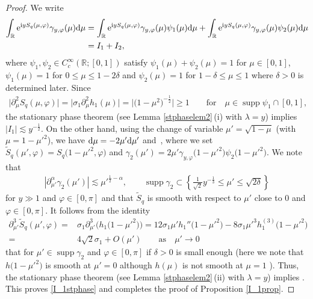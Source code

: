 \documentclass[pdftex]{sigma}
\numberwithin{equation}{section}
\def\R{\mathbb{R}}%
\def\d{\,\mathrm{d}}%
\DeclareMathOperator{\supp}{supp}%
\def\a{\alpha}
\def\c{\gamma}
\def\d{\delta}
\def\f{\varphi}
\def\g{\psi}
\def\l{\lambda}
\def\m{\mu}
\def\s{\sigma}
\def\pa{\partial}
\begin{document}
\begin{proof}
We write
\begin{align*}
\int_{\R}{\rm e}^{{\rm i}yS_q(\m,\f) }\c_{y,\f}(\m){\rm d}\m&=\int_{\R}{\rm e}^{{\rm i}yS_q(\m,\f) }\c_{y,\f}(\m)\g_1(\m){\rm d}\m+\int_{\R}{\rm e}^{{\rm i}yS_q(\m,\f) }\c_{y,\f}(\m)\g_2(\m){\rm d}\m\\
&=I_1+I_2,
\end{align*}
where $\g_1,\g_2\in C_c^{\infty}(\R;[0,1])$ satisfy $\g_1(\m)+\g_2(\m)=1$ for $\m\in [0,1]$, $\g_1(\m)=1$ for $0\leq \m\leq 1-2\d$ and $\g_2(\m)=1$ for $1-\d\leq \m\leq 1$ where $\d>0$ is determined later.
Since
\begin{align*}
\big|\pa_{\m}^2S_{q}(\m,\f)\big|=\big|\s_1\pa_{\m}^2h_1(\m)\big|=\big|\bigl(1-\m^2\bigr)^{-\frac{1}{2}}\big|\ge 1\qquad \text{for}\quad \m\in \supp \g_1\cap[0,1],
\end{align*}
the stationary phase theorem (see Lemma \ref{stphaselem2}\,(i) with $\l=y$) implies $|I_1|\lesssim y^{-\frac{1}{2}}$.
On the other hand, using the change of variable $\m'=\sqrt{1-\m}$ (with $\m=1-\m'^2$), we have ${\rm d}\m=-2\m'{\rm d}\m'$ and~\smash{$
I_2=\int_{\R}{\rm e}^{{\rm i}y\tilde{S}_q(\m',\f) }\c_2(\m'){\rm d}\m'$},
where we set $\tilde{S}_q(\m',\f)=S_q\bigl(1-\m'^2,\f\bigr)$ and $\c_2(\m')=2\m'\c_{y,\f}\bigl(1-\m'^2\bigr)\g_2\bigl(1-\m'^2\bigr)$. We note that
\begin{align*}
|\pa_{\m'}^{\a}\c_2(\m')|\lesssim\m'^{\frac{1}{2}-\a},\qquad\supp\c_2\subset \left\{ \frac{1}{\sqrt{2}}y^{-\frac{1}{3}}\leq \m'\leq \sqrt{2\d}\right\}
\end{align*}
for $y\gg 1$ and $\f\in [0,\pi]$ and that $\tilde{S}_q$ is smooth with respect to $\m'$ close to $0$ and $\f\in[0,\pi]$.
It follows from the identity
\begin{align*}
\pa_{\m'}^3\tilde{S}_q(\m',\f)={}&\s_1\pa_{\m'}^3\bigl(h_1\bigl(1-\m'^2\bigr)\bigr)=12\s_1\m' h_1''\bigl(1-\m'^2\bigr)-8\s_1\m'^3h_1^{(3)}\bigl(1-\m'^2\bigr)\\
={}&4\sqrt{2}\s_1+O(\m')\qquad \text{as}\quad \m'\to 0
\end{align*}
that \smash{$\big|\pa_{\m'}^3\tilde{S}_{q}(\m',\f)\big|\gtrsim 1$} for $\m'\in \supp \c_2$ and $\f\in [0,\pi]$ if $\d>0$ is small enough (here we note that~${h\bigl(1-\m'^2\bigr)}$ is smooth at $\m'=0$ although $h(\m)$ is not smooth at $\m=1$ ). Thus, the stationary phase theorem (see Lemma \ref{stphaselem2}\,(ii) with $\l=y$) implies
.
This proves \eqref{I_1stphase} and completes the proof of Proposition \ref{I_1prop}.
\end{proof}
\end{document}
